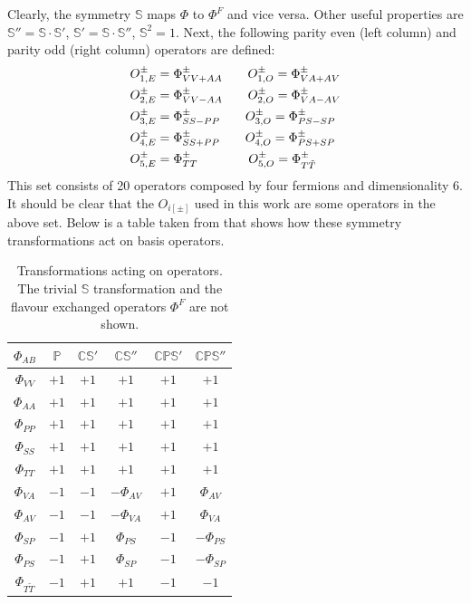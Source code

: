\documentclass[english, LaM, oneside, noexaminfo]{sapthesis}
\begin{document}
Clearly, the symmetry $\mathbb{S}$ maps $\Phi$ to $\Phi^F$ and vice versa.
Other useful properties are $\mathbb{S}'' = \mathbb{S}\cdot \mathbb{S}'$, $\mathbb{S}' = \mathbb{S}\cdot \mathbb{S}''$, $\mathbb{S}^2 = 1$.
Next, the following parity even (left column) and parity odd (right column) operators are defined:
\begin{equation*}
    \begin{split}
        & O_{1,E}^\pm = \Phi^\pm_{VV+AA} \qquad O_{1,O}^\pm = \Phi^\pm_{VA+AV} \\
        & O_{2,E}^\pm = \Phi^\pm_{VV-AA} \qquad O_{2,O}^\pm = \Phi^\pm_{VA-AV} \\
        & O_{3,E}^\pm = \Phi^\pm_{SS-PP} \qquad O_{3,O}^\pm = \Phi^\pm_{PS-SP} \\
        & O_{4,E}^\pm = \Phi^\pm_{SS+PP} \qquad O_{4,O}^\pm = \Phi^\pm_{PS+SP} \\
        & O_{5,E}^\pm = \Phi^\pm_{TT}    \hspace*{40pt} O_{5,O}^\pm = \Phi^\pm_{T\tilde{T}} \\
    \end{split}
\end{equation*}
This set consists of 20 operators composed by four fermions and dimensionality 6.
It should be clear that the $O_{i[\pm]}$ used in this work are some operators in the above set.
Below is a table taken from \cite{DoniniMartinelliOperators} that shows how these symmetry transformations act on basis operators.
\begin{table}[ht]
    \centering
    \begin{tabular}{c|ccccc}
        $\Phi_{AB}$ & $\mathbb{P}$ & $\mathbb{CS}'$ & $\mathbb{CS}''$ & $\mathbb{CPS}'$ & $\mathbb{CPS}'' $\\
        \hline
        $\Phi_{VV}$        & $+1$ & $+1$ & $+1$ & $+1$ & $+1$ \\
        $\Phi_{AA}$        & $+1$ & $+1$ & $+1$ & $+1$ & $+1$ \\
        $\Phi_{PP}$        & $+1$ & $+1$ & $+1$ & $+1$ & $+1$ \\
        $\Phi_{SS}$        & $+1$ & $+1$ & $+1$ & $+1$ & $+1$ \\
        $\Phi_{TT}$        & $+1$ & $+1$ & $+1$ & $+1$ & $+1$ \\
        \hline
        $\Phi_{VA}$        & $-1$ & $-1$ & $-\Phi_{AV}$ & $+1$ & $\Phi_{AV}$    \\
        $\Phi_{AV}$        & $-1$ & $-1$ & $-\Phi_{VA}$ & $+1$ & $\Phi_{VA}$    \\
        $\Phi_{SP}$        & $-1$ & $+1$ & $\Phi_{PS}$  & $-1$ & $-\Phi_{PS}$   \\
        $\Phi_{PS}$        & $-1$ & $+1$ & $\Phi_{SP}$  & $-1$ & $-\Phi_{SP}$   \\
        $\Phi_{T\tilde T}$ & $-1$ & $+1$ & $+1$         & $-1$ & $-1$           \\
    \end{tabular}
    \vspace*{.6mm}
    \label{tab:symmetries-of-operators}
    \caption{Transformations acting on operators. The trivial $\mathbb{S}$ transformation and the flavour exchanged operators $\Phi^F$ are not shown.}
\end{table}
\end{document}
